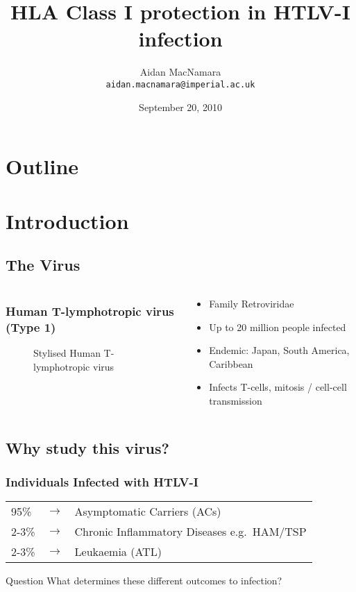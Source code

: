 \documentclass[slidescentered,compress]{beamer}
\title[HLA Class I protection in HTLV-I infection]{HLA Class I protection in HTLV-I infection}
\author{Aidan MacNamara \\ \texttt{aidan.macnamara@imperial.ac.uk}}
\date{September 20, 2010}
\begin{document}
\frame{\titlepage}

\section*{Outline}
\frame{\tableofcontents}

\section{Introduction}
\subsection{The Virus}

\frame
{
\begin{columns}[c]

\begin{column}{6cm}
\frametitle{Human T-lymphotropic virus (Type 1)}
\begin{figure}
	\caption{Stylised Human T-lymphotropic virus}
\end{figure}
\end{column}

\begin{column}{4cm}
\begin{itemize}
\item Family Retroviridae 
\item Up to 20 million people infected  
\item Endemic: Japan, South America, Caribbean
\item Infects T-cells, mitosis / cell-cell transmission
\end{itemize}
\end{column}

\end{columns}
}

\subsection{Why study this virus?}

\frame
{
\frametitle{Individuals Infected with HTLV-I}

\begin{table}[htbp]
\centering
\begin{tabular}{lll}
95\% & $\rightarrow$ & Asymptomatic Carriers (ACs) \\ 
2-3\% & $\rightarrow$ & Chronic Inflammatory Diseases e.g.~HAM/TSP \\ 
2-3\% & $\rightarrow$ & Leukaemia (ATL) \\
\end{tabular}
\end{table}

\pause

\begin{block}{Question}
What determines these different outcomes to infection?
\end{block}

}
\end{document}
